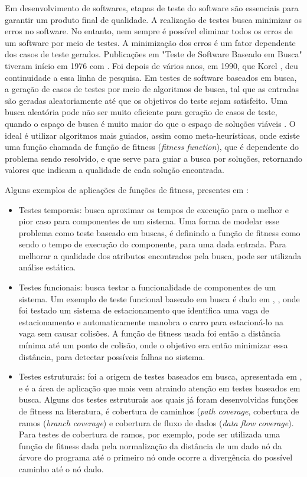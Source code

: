 \documentclass[conference]{IEEEtran}
\begin{document}
Em desenvolvimento de softwares, etapas de teste do software são essenciais para garantir um produto final de qualidade. A realização de testes busca minimizar os erros no software. No entanto, nem sempre é possível eliminar todos os erros de um software por meio de testes. A minimização dos erros é um fator dependente dos casos de teste gerados. Publicações em "Teste de Software Baseado em Busca" tiveram início em 1976 com \cite{Miller:1976}. Foi depois de vários anos, em 1990, que Korel \cite{Korel:1990}, \cite{Korel:1992} deu continuidade a essa linha de pesquisa. Em testes de software baseados em busca, a geração de casos de testes por meio de algoritmos de busca, tal que as entradas são geradas aleatoriamente até que os objetivos do teste sejam satisfeito. Uma busca aleatória pode não ser muito eficiente para geração de casos de teste, quando o espaço de busca é muito maior do que o espaço de soluções viáveis \cite{McMinn:2011}. O ideal é utilizar algoritmos mais guiados, assim como meta-heurísticas, onde existe uma função chamada de função de fitness (\emph{fitness function}), que é dependente do problema sendo resolvido, e que serve para guiar a busca por soluções, retornando valores que indicam a qualidade de cada solução encontrada. 

Alguns exemplos de aplicações de funções de fitness, presentes em \cite{McMinn:2011}:

\begin{itemize}
\item Testes temporais: busca aproximar os tempos de execução para o melhor e pior caso para componentes de um sistema. Uma forma de modelar esse problema como teste baseado em buscas, é definindo a função de fitness como sendo o tempo de execução do componente, para uma dada entrada. Para melhorar a qualidade dos atributos encontrados pela busca, pode ser utilizada análise estática.

\item Testes funcionais: busca testar a funcionalidade de componentes de um sistema. Um exemplo de teste funcional baseado em busca é dado em \cite{Buhler:2003}, \cite{Buhler:2008}, onde foi testado um sistema de estacionamento que identifica uma vaga de estacionamento e automaticamente manobra o carro para estacioná-lo na vaga sem causar colisões. A função de fitness usada foi então a distância mínima até um ponto de colisão, onde o objetivo era então minimizar essa distância, para detectar possíveis falhas no sistema.

\item Testes estruturais: foi a origem de testes baseados em busca, apresentada em \cite{Miller:1976}, e é a área de aplicação que mais vem atraindo atenção em testes baseados em busca. Alguns dos testes estruturais aos quais já foram desenvolvidas funções de fitness na literatura, é cobertura de caminhos (\emph{path coverage}, cobertura de ramos (\emph{branch coverage}) e cobertura de fluxo de dados (\emph{data flow coverage}). Para testes de cobertura de ramos, por exemplo, pode ser utilizada uma função de fitness dada pela normalização da distância de um dado nó da árvore do programa até o primeiro nó onde ocorre a divergência do possível caminho até o nó dado.
\end{itemize}
\end{document}
